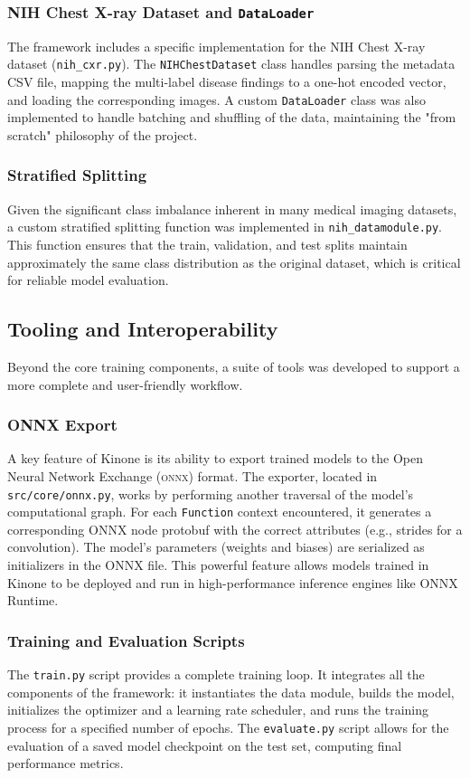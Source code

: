 \documentclass[a4paper]{article}
\newcommand{\acronym}[1]{\textsc{#1}}
\begin{document}
\subsubsection{NIH Chest X-ray Dataset and \texttt{DataLoader}}
The framework includes a specific implementation for the NIH Chest X-ray dataset (\texttt{nih\_cxr.py}). The \texttt{NIHChestDataset} class handles parsing the metadata CSV file, mapping the multi-label disease findings to a one-hot encoded vector, and loading the corresponding images. A custom \texttt{DataLoader} class was also implemented to handle batching and shuffling of the data, maintaining the "from scratch" philosophy of the project.

\subsubsection{Stratified Splitting}
Given the significant class imbalance inherent in many medical imaging datasets, a custom stratified splitting function was implemented in \texttt{nih\_datamodule.py}. This function ensures that the train, validation, and test splits maintain approximately the same class distribution as the original dataset, which is critical for reliable model evaluation.

\subsection{Tooling and Interoperability}
Beyond the core training components, a suite of tools was developed to support a more complete and user-friendly workflow.

\subsubsection{ONNX Export}
A key feature of Kinone is its ability to export trained models to the Open Neural Network Exchange (\acronym{onnx}) format. The exporter, located in \texttt{src/core/onnx.py}, works by performing another traversal of the model's computational graph. For each \texttt{Function} context encountered, it generates a corresponding ONNX node protobuf with the correct attributes (e.g., strides for a convolution). The model's parameters (weights and biases) are serialized as initializers in the ONNX file. This powerful feature allows models trained in Kinone to be deployed and run in high-performance inference engines like ONNX Runtime.

\subsubsection{Training and Evaluation Scripts}
The \texttt{train.py} script provides a complete training loop. It integrates all the components of the framework: it instantiates the data module, builds the model, initializes the optimizer and a learning rate scheduler, and runs the training process for a specified number of epochs. The \texttt{evaluate.py} script allows for the evaluation of a saved model checkpoint on the test set, computing final performance metrics.
\end{document}
